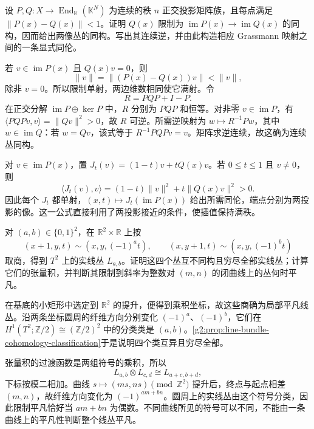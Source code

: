 \begin{exercise}\label{g2:ex:nearby-projections-bundle-isomorphism}
	设 \(P,Q:X\to\operatorname{End}_{\mathbb K}(\mathbb K^N)\) 为连续的秩 \(n\) 正交投影矩阵族，且每点满足 \(\|P(x)-Q(x)\|<1\)。证明 \(Q(x)\) 限制为 \(\operatorname{im}P(x)\to\operatorname{im}Q(x)\) 的同构，因而给出两像丛的同构。写出其连续逆，并由此构造相应 Grassmann 映射之间的一条显式同伦。
\end{exercise}
\begin{solution}
	若 \(v\in\operatorname{im}P(x)\) 且 \(Q(x)v=0\)，则
	\[
		\|v\|=\|(P(x)-Q(x))v\|<\|v\|,
	\]
	除非 \(v=0\)。所以限制单射，两边维数相同使它满射。令
	\[
		R=PQP+I-P.
	\]
	在正交分解 \(\operatorname{im}P\oplus\ker P\) 中，\(R\) 分别为 \(PQP\) 和恒等。对非零 \(v\in\operatorname{im}P\)，有 \(\langle PQPv,v\rangle=\|Qv\|^2>0\)，故 \(R\) 可逆。所需逆映射为 \(w\mapsto R^{-1}Pw\)，其中 \(w\in\operatorname{im}Q\)：若 \(w=Qv\)，该式等于 \(R^{-1}PQPv=v\)。矩阵求逆连续，故这确为连续丛同构。

	对 \(v\in\operatorname{im}P(x)\)，置 \(J_t(v)=(1-t)v+tQ(x)v\)。若 \(0\le t\le1\) 且 \(v\ne0\)，则
	\[
		\langle J_t(v),v\rangle=(1-t)\|v\|^2+t\|Q(x)v\|^2>0.
	\]
	因此每个 \(J_t\) 都单射，\((x,t)\mapsto J_t(\operatorname{im}P(x))\) 给出所需同伦，端点分别为两投影的像。这一公式直接利用了两投影接近的条件，使插值保持满秩。
\end{solution}

\begin{exercise}\label{g2:ex:line-bundles-torus-signs}
	对 \((a,b)\in\{0,1\}^2\)，在 \(\mathbb R^2\times\mathbb R\) 上按
	\[
		(x+1,y,t)\sim(x,y,(-1)^at),\qquad
		(x,y+1,t)\sim(x,y,(-1)^bt)
	\]
	取商，得到 \(T^2\) 上的实线丛 \(L_{a,b}\)。证明这四个丛互不同构且穷尽全部实线丛；计算它们的张量积，并判断其限制到斜率为整数对 \((m,n)\) 的闭曲线上的丛何时平凡。
\end{exercise}
\begin{solution}
	在基底的小矩形中选定到 \(\mathbb R^2\) 的提升，便得到乘积坐标，故这些商确为局部平凡线丛。沿两条坐标圆周的纤维方向分别变化 \((-1)^a\)、\((-1)^b\)，它们在 \(H^1(T^2;\mathbb Z/2)\cong(\mathbb Z/2)^2\) 中的分类类是 \((a,b)\)。\cref{g2:prop:line-bundle-cohomology-classification}于是说明四个类互异且穷尽全部。

	张量积的过渡函数是两组符号的乘积，所以
	\[
		L_{a,b}\otimes L_{c,d}\cong L_{a+c,b+d},
	\]
	下标按模二相加。曲线 \(s\mapsto(ms,ns)\pmod{\mathbb Z^2}\) 提升后，终点与起点相差 \((m,n)\)，故纤维方向变化为 \((-1)^{am+bn}\)。圆周上的实线丛由这个符号分类，因此限制平凡恰好当 \(am+bn\) 为偶数。不同曲线所见的符号可以不同，不能由一条曲线上的平凡性判断整个线丛平凡。
\end{solution}

